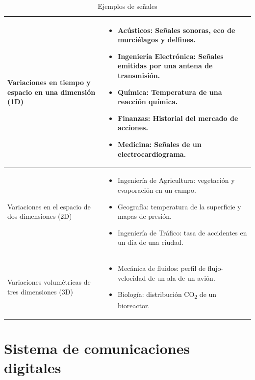 \begin{table}[ht]
\begin{center}
	\begin{tabular}{|p{6cm}|p{7.3cm}|}
		\hline
		Variaciones en tiempo y espacio en una dimensi\'on (1D) &
		\begin{itemize}
		  \item Ac\'usticos: Se\~nales sonoras, eco de murci\'elagos y delfines.
		  \item Ingenier\'ia Electr\'onica: Se\~nales emitidas por una antena de
		  transmisi\'on.
		  \item Qu\'imica: Temperatura de una reacci\'on qu\'imica.
		  \item Finanzas: Historial del mercado de acciones.
		  \item Medicina: Se\~nales de un electrocardiograma.
		\end{itemize} \\
		\hline
		Variaciones en el espacio de dos dimensiones (2D) &
		\begin{itemize}
		  \item Ingenier\'ia de Agricultura: vegetaci\'on y evaporaci\'on en un campo.
		  \item Geograf\'ia: temperatura de la superficie y mapas de presi\'on.
		  \item Ingenier\'ia de Tr\'afico: tasa de accidentes en un d\'ia de una
		  ciudad.
		\end{itemize} \\
		\hline
		Variaciones volum\'etricas de tres dimensiones (3D) &
		\begin{itemize}
		  \item Mec\'anica de fluidos: perfil de flujo-velocidad de un ala de un
		  avi\'on.
		  \item Biolog\'ia: distribuci\'on CO\textsubscript{2} de un bioreactor.
		\end{itemize} \\
		\hline
	\end{tabular}
	\vspace{0.5in}
	\caption{Ejemplos de se\~nales}
	\label{tbl:signals}
\end{center}
\end{table}

\newpage
\section{Sistema de comunicaciones digitales}


